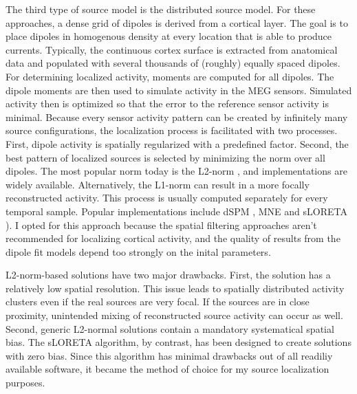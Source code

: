 The third type of source model is the distributed source model.
For these approaches, a dense grid of dipoles is derived from a cortical layer.
The goal is to place dipoles in homogenous density at every location that is able to produce currents.
Typically, the continuous cortex surface is extracted from anatomical data and populated with several thousands of (roughly) equally spaced dipoles.
For determining localized activity, moments are computed for all dipoles.
The dipole moments are then used to simulate activity in the MEG sensors.
Simulated activity then is optimized so that the error to the reference sensor activity is minimal.
Because every sensor activity pattern can be created by infinitely many source configurations, the localization process is facilitated with two processes.
First, dipole activity is spatially regularized with a predefined factor.
Second, the best pattern of localized sources is selected by minimizing the norm over all dipoles.
The most popular norm today is the L2-norm \cite{1.5.L2}, and implementations are widely available.
Alternatively, the L1-norm \cite{1.5.L1} can result in a more focally reconstructed activity.
This process is usually computed separately for every temporal sample.
Popular implementations include dSPM \cite{1.5.dSPM}, MNE \cite{1.5.MNE} and sLORETA \cite{1.5.sLORETA}).
I opted for this approach because the spatial filtering approaches aren't recommended for localizing cortical activity, and the quality of results from the dipole fit models depend too strongly on the inital parameters.

L2-norm-based solutions have two major drawbacks.
First, the solution has a relatively low spatial resolution.
This issue leads to spatially distributed activity clusters even if the real sources are very focal.
If the sources are in close proximity, unintended mixing of reconstructed source activity can occur as well.
Second, generic L2-normal solutions contain a mandatory systematical spatial bias.
The sLORETA algorithm, by contrast, has been designed to create solutions with zero bias.
Since this algorithm has minimal drawbacks out of all readiliy available software, it became the method of choice for my source localization purposes.

